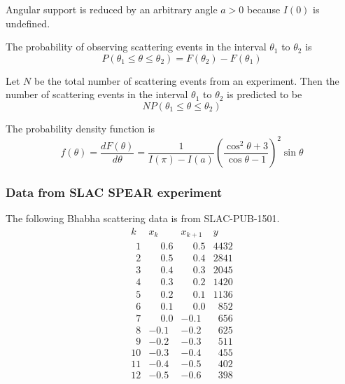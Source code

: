 Angular support is reduced by an arbitrary angle $a>0$ because $I(0)$ is undefined.

\bigskip
The probability of observing scattering events in the interval $\theta_1$ to $\theta_2$ is
\begin{equation*}
P(\theta_1\le\theta\le\theta_2)=F(\theta_2)-F(\theta_1)
\end{equation*}

Let $N$ be the total number of scattering events from an experiment.
Then the number of scattering events in the interval $\theta_1$
to $\theta_2$ is predicted to be
\begin{equation*}
NP(\theta_1\le\theta\le\theta_2)
\end{equation*}

The probability density function is
\begin{equation*}
f(\theta)=\frac{dF(\theta)}{d\theta}
=\frac{1}{I(\pi)-I(a)}
\left(\frac{\cos^2\theta+3}{\cos\theta-1}\right)^2
\sin\theta
\end{equation*}

\subsubsection*{Data from SLAC SPEAR experiment}
The following Bhabha scattering data is from SLAC-PUB-1501.
\begin{equation*}
\begin{matrix}
k & x_k & x_{k+1} & y\\
\phantom01 & \phantom+0.6 & \phantom+0.5 & 4432\\
\phantom02 & \phantom+0.5 & \phantom+0.4 & 2841\\
\phantom03 & \phantom+0.4 & \phantom+0.3 & 2045\\
\phantom04 & \phantom+0.3 & \phantom+0.2 & 1420\\
\phantom05 & \phantom+0.2 & \phantom+0.1 & 1136\\
\phantom06 & \phantom+0.1 & \phantom+0.0 & \phantom{0}852\\
\phantom07 & \phantom+0.0 & -0.1 & \phantom{0}656\\
\phantom08 & -0.1 & -0.2 & \phantom{0}625\\
\phantom09 & -0.2 & -0.3 & \phantom{0}511\\
10 & -0.3 & -0.4 & \phantom{0}455\\
11 & -0.4 & -0.5 & \phantom{0}402\\
12 & -0.5 & -0.6 & \phantom{0}398\\
\end{matrix}
\end{equation*}

